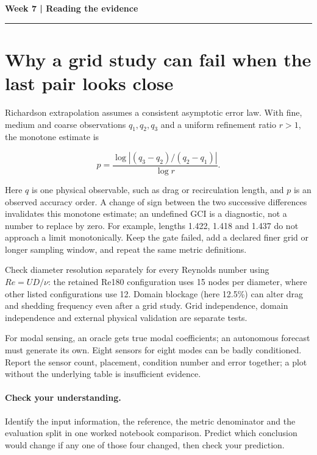 \documentclass[11pt]{article}
\begin{document}
\noindent\textbf{Week 7 | Reading the evidence}\par\medskip\hrule\medskip
\section*{Why a grid study can fail when the last pair looks close}
Richardson extrapolation assumes a consistent asymptotic error law. With fine,
medium and coarse observations $q_1,q_2,q_3$ and a uniform refinement ratio $r>1$,
the monotone estimate is

\[p=\frac{\log |(q_3-q_2)/(q_2-q_1)|}{\log r}.\]

Here $q$ is one physical observable, such as drag or recirculation length, and
$p$ is an observed accuracy order. A change of sign between the two successive
differences invalidates this monotone estimate; an undefined GCI is a diagnostic,
not a number to replace by zero. For example, lengths 1.422, 1.418 and 1.437 do
not approach a limit monotonically. Keep the gate failed, add a declared finer
grid or longer sampling window, and repeat the same metric definitions.

Check diameter resolution separately for every Reynolds number using
$Re=UD/\nu$: the retained Re180 configuration uses 15 nodes per diameter,
where other listed configurations use 12. Domain blockage (here 12.5\%) can alter
drag and shedding frequency even after a grid study. Grid independence, domain
independence and external physical validation are separate tests.

For modal sensing, an oracle gets true modal coefficients; an autonomous forecast
must generate its own. Eight sensors for eight modes can be badly conditioned.
Report the sensor count, placement, condition number and error together; a plot
without the underlying table is insufficient evidence.
\paragraph{Check your understanding.}
Identify the input information, the reference, the metric denominator and the
evaluation split in one worked notebook comparison. Predict which conclusion
would change if any one of those four changed, then check your prediction.
\end{document}
